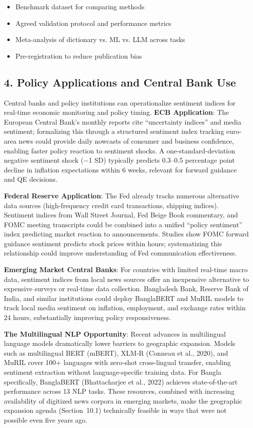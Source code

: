 \documentclass[11pt,twocolumn]{article}
\begin{document}
\begin{itemize}
\item Benchmark dataset for comparing methods
\item Agreed validation protocol and performance metrics
\item Meta-analysis of dictionary vs. ML vs. LLM across tasks
\item Pre-registration to reduce publication bias
\end{itemize}

\subsection{4. Policy Applications and Central Bank Use}

Central banks and policy institutions can operationalize sentiment indices for real-time economic monitoring and policy timing. \textbf{ECB Application}: The European Central Bank's monthly reports cite ``uncertainty indices'' and media sentiment; formalizing this through a structured sentiment index tracking euro-area news could provide daily nowcasts of consumer and business confidence, enabling faster policy reaction to sentiment shocks. A one-standard-deviation negative sentiment shock ($-$1 SD) typically predicts 0.3--0.5 percentage point decline in inflation expectations within 6 weeks, relevant for forward guidance and QE decisions.

\textbf{Federal Reserve Application}: The Fed already tracks numerous alternative data sources (high-frequency credit card transactions, shipping indices). Sentiment indices from Wall Street Journal, Fed Beige Book commentary, and FOMC meeting transcripts could be combined into a unified ``policy sentiment'' index predicting market reaction to announcements. Studies show FOMC forward guidance sentiment predicts stock prices within hours; systematizing this relationship could improve understanding of Fed communication effectiveness.

\textbf{Emerging Market Central Banks}: For countries with limited real-time macro data, sentiment indices from local news sources offer an inexpensive alternative to expensive surveys or real-time data collection. Bangladesh Bank, Reserve Bank of India, and similar institutions could deploy BanglaBERT and MuRIL models to track local media sentiment on inflation, employment, and exchange rates within 24 hours, substantially improving policy responsiveness.

\textbf{The Multilingual NLP Opportunity}: Recent advances in multilingual language models dramatically lower barriers to geographic expansion. Models such as multilingual BERT (mBERT), XLM-R (Conneau et al., 2020), and MuRIL cover 100+ languages with zero-shot cross-lingual transfer, enabling sentiment extraction without language-specific training data. For Bangla specifically, BanglaBERT (Bhattacharjee et al., 2022) achieves state-of-the-art performance across 13 NLP tasks. These resources, combined with increasing availability of digitized news corpora in emerging markets, make the geographic expansion agenda (Section~10.1) technically feasible in ways that were not possible even five years ago.
\end{document}

